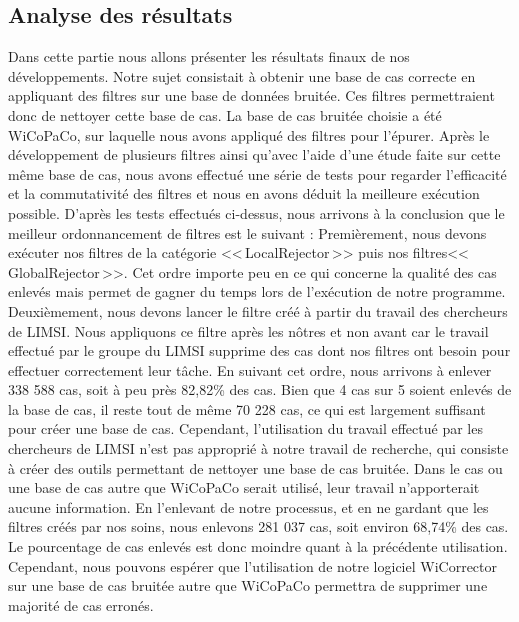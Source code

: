 \documentclass[11pt]{article}
\begin{document}
\subsection{Analyse des r\'{e}sultats}
Dans cette partie nous allons pr\'{e}senter les r\'{e}sultats finaux de nos d\'{e}veloppements. Notre sujet consistait \`{a} obtenir une base de cas correcte en appliquant des filtres sur une base de donn\'{e}es bruit\'{e}e. Ces filtres permettraient donc de nettoyer cette base de cas.
\newline
\newline
	La base de cas bruit\'{e}e choisie a \'{e}t\'{e} WiCoPaCo, sur laquelle nous avons appliqu\'{e} des filtres pour l'\'{e}purer. Apr\`{e}s le d\'{e}veloppement de plusieurs filtres ainsi qu'avec l'aide d'une \'{e}tude faite sur cette m\^{e}me base de cas, nous avons effectu\'{e} une s\'{e}rie de tests pour regarder l'efficacit\'{e} et la commutativit\'{e} des filtres et nous en avons d\'{e}duit la meilleure ex\'{e}cution possible. D'apr\`{e}s les tests effectu\'{e}s ci-dessus, nous arrivons \`{a} la conclusion que le meilleur ordonnancement de filtres est le suivant : 
\newline
\newline
Premi\`{e}rement, nous devons  ex\'{e}cuter nos filtres de la cat\'{e}gorie <<\,LocalRejector\,>> puis nos filtres\newline<<\,GlobalRejector\,>>. Cet ordre importe peu en ce qui concerne la qualit\'{e} des cas enlev\'{e}s mais permet de gagner du temps lors de l'ex\'{e}cution de notre programme. Deuxi\`{e}mement, nous devons lancer le filtre cr\'{e}\'{e} \`{a} partir du travail des chercheurs de LIMSI. Nous appliquons ce filtre apr\`{e}s les n\^{o}tres et non avant car le travail effectu\'{e} par le groupe du LIMSI supprime des cas dont nos filtres ont besoin pour effectuer correctement leur t\^{a}che.
\newline
\newline
En suivant cet ordre, nous arrivons \`{a} enlever 338 588 cas, soit \`{a} peu pr\`{e}s 82,82\% des cas. Bien que 4 cas sur 5 soient enlev\'{e}s de la base de cas, il reste tout de m\^{e}me 70 228 cas, ce qui est largement suffisant pour cr\'{e}er une base de cas. Cependant, l'utilisation du travail effectu\'{e} par les chercheurs de LIMSI n'est pas appropri\'{e} \`{a} notre travail de recherche, qui consiste \`{a} cr\'{e}er des outils permettant de nettoyer une base de cas bruit\'{e}e. Dans le cas ou une base de cas autre que WiCoPaCo serait utilis\'{e}, leur travail n'apporterait aucune information. 
\newline
\newline
En l'enlevant de notre processus, et en ne gardant que les filtres cr\'{e}\'{e}s par nos soins, nous enlevons 281 037 cas, soit environ 68,74\% des cas. Le pourcentage de cas enlev\'{e}s est donc moindre quant \`{a} la pr\'{e}c\'{e}dente utilisation. Cependant,  nous pouvons esp\'{e}rer que l'utilisation de notre logiciel WiCorrector sur une base de cas bruit\'{e}e autre que WiCoPaCo permettra de supprimer une majorit\'{e} de cas erron\'{e}s.
\end{document}
